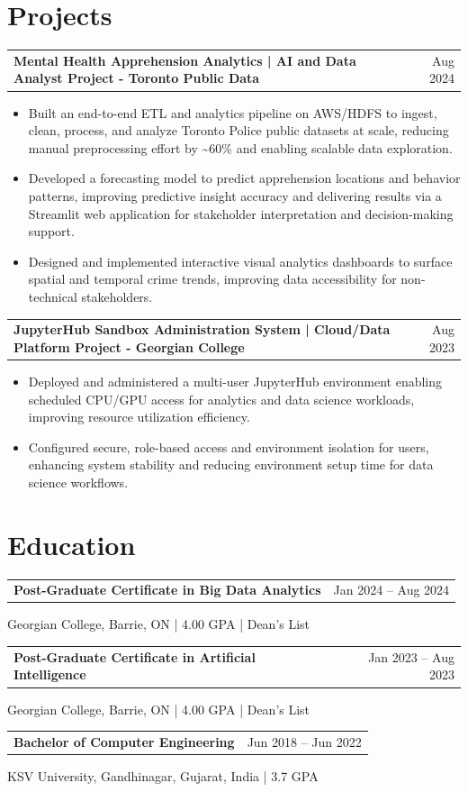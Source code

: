 \documentclass[10.5pt,letterpaper]{article}
\makeatletter
\newcommand{\resumeRow}[2]{%
  \noindent\begin{tabularx}{\linewidth}{@{}X r@{}}
    \textbf{#1} & #2 \\
  \end{tabularx}%
}
\makeatother
\begin{document}
\section{Projects}
\resumeRow{Mental Health Apprehension Analytics | AI and Data Analyst Project - Toronto Public Data}{Aug 2024}
\begin{itemize}
  \item Built an end-to-end ETL and analytics pipeline on AWS/HDFS to ingest, clean, process, and analyze Toronto Police public datasets at scale, reducing manual preprocessing effort by \textasciitilde{}60\% and enabling scalable data exploration.
  \item Developed a forecasting model to predict apprehension locations and behavior patterns, improving predictive insight accuracy and delivering results via a Streamlit web application for stakeholder interpretation and decision-making support.
  \item Designed and implemented interactive visual analytics dashboards to surface spatial and temporal crime trends, improving data accessibility for non-technical stakeholders.
\end{itemize}
\resumeRow{JupyterHub Sandbox Administration System | Cloud/Data Platform Project - Georgian College}{Aug 2023}
\begin{itemize}
  \item Deployed and administered a multi-user JupyterHub environment enabling scheduled CPU/GPU access for analytics and data science workloads, improving resource utilization efficiency.
  \item Configured secure, role-based access and environment isolation for users, enhancing system stability and reducing environment setup time for data science workflows.
\end{itemize}

\section{Education}
\resumeRow{Post-Graduate Certificate in Big Data Analytics}{Jan 2024 -- Aug 2024}
{\small Georgian College, Barrie, ON | 4.00 GPA | Dean's List}\\[2pt]\resumeRow{Post-Graduate Certificate in Artificial Intelligence}{Jan 2023 -- Aug 2023}
{\small Georgian College, Barrie, ON | 4.00 GPA | Dean's List}\\[2pt]\resumeRow{Bachelor of Computer Engineering}{Jun 2018 -- Jun 2022}
{\small KSV University, Gandhinagar, Gujarat, India | 3.7 GPA}
\end{document}
